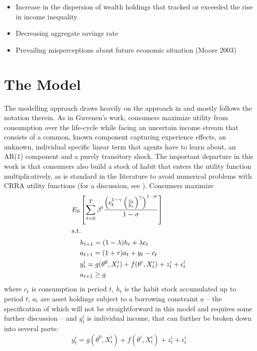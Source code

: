 \begin{itemize}
\item Increase in the dispersion of wealth holdings that tracked or exceeded the rise in income inequality
\item Decreasing aggregate savings rate
\item Prevailing misperceptions about future economic situation (Moore 2003)
\end{itemize}

\pagebreak
\section{The Model}\label{sec:model}
The modelling approach draws heavily on the approach in \citet{Guvenen2007} and mostly follows the notation therein. As in Guvenen's work, consumers maximize utility from consumption over the life-cycle while facing an uncertain income stream that consists of a common, known component capturing experience effects, an unknown, individual specific linear term that agents have to learn about, an AR(1) component and a purely transitory shock. The important departure in this work is that consumers also build a stock of habit that enters the utility function multiplicatively, as is standard in the literature to avoid numerical problems with CRRA utility functions (for a discussion, see \citet{Carroll2000}). 
Consumers maximize
\begin{align}
E_0 &\left[ \sum_{t=0}^{T} \beta^{t} \frac{\left( c_{t}^{1-\gamma} \left( \frac{c_{t}}{h_{t}} \right)^{\gamma} \right)^{1-\sigma}}{1-\sigma} \right] \label{eq:maxprob} \\
\intertext{s.t. } &h_{t+1} = (1-\lambda)h_t + \lambda c_t \label{eq:habits} \\
									&a_{t+1} = (1+r)a_t + y_t - c_t \label{eq:bc} \\
									&y_{t}^i = g(\theta^0, X_t^i) + f(\theta^i, X_t^i) + z_t^i + \epsilon_t^i \label{eq:incproc} \\
  								&a_{t+1} \geq \underline{a} \label{eq:borrcons} 
\end{align}
where $c_t$ is consumption in period $t$, $h_t$ is the habit stock accumulated up to period $t$, $a_t$ are asset holdings subject to a borrowing constraint $\underline{a}$ -- the specification of which will not be straightforward in this model and requires some further discussion -- and $y_t^i$ is individual income, that can further be broken down into several parts: 
\begin{equation*}
y_{t}^i = g(\theta^0, X_t^i) + f(\theta^i, X_t^i) + z_t^i + \epsilon_t^i 
\end{equation*}
